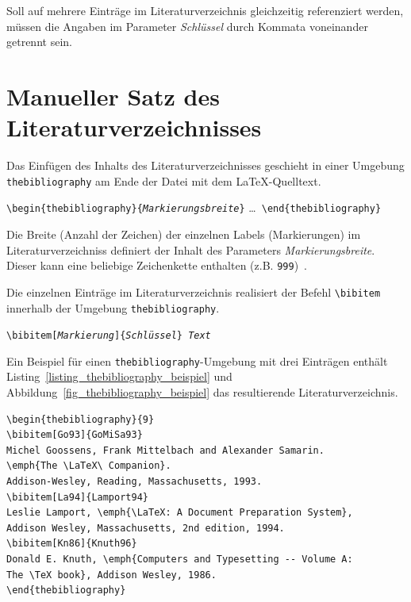 \documentclass[a4paper,10pt,twoside]{scrbook}
\begin{document}
{Soll auf mehrere Einträge im Literaturverzeichnis gleichzeitig referenziert werden, müssen die Angaben im Parameter \textsl{Schlüssel} durch Kommata voneinander getrennt sein.


\section{Manueller Satz des Literaturverzeichnisses}
\label{Abschnitt_thebibliography}

Das Einfügen des Inhalts des Literaturverzeichnisses geschieht in einer Umgebung \verb!thebibliography! am Ende der Datei mit dem \LaTeX-Quelltext.

\begin{boxedminipage}{\textwidth}
	\texttt{\textbackslash begin\{thebibliography\}\{\textsl{Markierungsbreite}\}} \enskip \dots\ \enskip \texttt{\textbackslash end\{thebibliography\}} 
\end{boxedminipage}

Die Breite (Anzahl der Zeichen) der einzelnen Labels (Markierungen) im Literaturverzeichniss definiert der Inhalt des Parameters \textsl{Markierungsbreite}. Dieser kann eine beliebige Zeichenkette enthalten (z.B. \verb|999|)~\cite{voss2007referenz}.

Die einzelnen Einträge im Literaturverzeichnis realisiert der Befehl \verb|\bibitem| innerhalb der Umgebung \verb!thebibliography!. 

\begin{boxedminipage}{\textwidth}
	\texttt{\textbackslash bibitem[\textsl{Markierung}]\{\textsl{Schlüssel}\} \textsl{Text}} 
\end{boxedminipage}

Ein Beispiel für einen \verb!thebibliography!-Umgebung mit drei Einträgen enthält Listing~\ref{listing_thebibliography_beispiel} und  Abbildung~\ref{fig_thebibliography_beispiel} das resultierende Literaturverzeichnis.

\begin{lstlisting}[caption={Das allererste Beispiel},label=listing_thebibliography_beispiel, style=customlatex]
\begin{thebibliography}{9}
\bibitem[Go93]{GoMiSa93} 
Michel Goossens, Frank Mittelbach and Alexander Samarin. 
\emph{The \LaTeX\ Companion}. 
Addison-Wesley, Reading, Massachusetts, 1993.
\bibitem[La94]{Lamport94}
Leslie Lamport,	\emph{\LaTeX: A Document Preparation System},	
Addison Wesley, Massachusetts, 2nd edition, 1994.
\bibitem[Kn86]{Knuth96} 
Donald E. Knuth, \emph{Computers and Typesetting -- Volume A: 
The \TeX book}, Addison Wesley, 1986.
\end{thebibliography}
\end{lstlisting}

}
\end{document}
